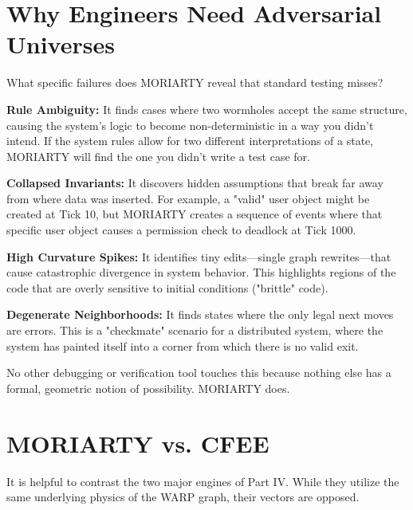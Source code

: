 \section{Why Engineers Need Adversarial Universes}

What specific failures does MORIARTY reveal that standard testing misses?

\textbf{Rule Ambiguity:} It finds cases where two wormholes accept the same structure, causing the system's logic to become non-deterministic in a way you didn't intend. If the system rules allow for two different interpretations of a state, MORIARTY will find the one you didn't write a test case for.

\textbf{Collapsed Invariants:} It discovers hidden assumptions that break far away from where data was inserted. For example, a "valid" user object might be created at Tick 10, but MORIARTY creates a sequence of events where that specific user object causes a permission check to deadlock at Tick 1000.

\textbf{High Curvature Spikes:} It identifies tiny edits—single graph rewrites—that cause catastrophic divergence in system behavior. This highlights regions of the code that are overly sensitive to initial conditions ("brittle" code).

\textbf{Degenerate Neighborhoods:} It finds states where the only legal next moves are errors. This is a "checkmate" scenario for a distributed system, where the system has painted itself into a corner from which there is no valid exit.

No other debugging or verification tool touches this because nothing else has a formal, geometric notion of possibility. MORIARTY does.

\section{MORIARTY vs. CFEE}

It is helpful to contrast the two major engines of Part IV. While they utilize the same underlying physics of the WARP graph, their vectors are opposed.

